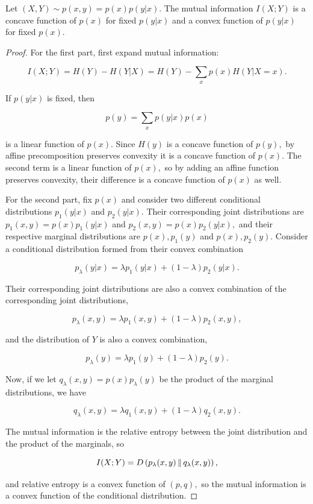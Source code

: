 \documentclass{article}
\begin{document}
\begin{theorem}
	Let $(X,Y) \sim p(x,y) = p(x)p(y|x).$ The \@{mutual information} $I(X;Y)$ is a \@{concave function} of $p(x)$ for fixed $p(y|x)$ and a \@{convex function} of $p(y|x)$ for fixed $p(x).$
\end{theorem}
\begin{proof}
For the first part, first expand \@{mutual information}:

	\[ I(X; Y) = H(Y) - H(Y|X) = H(Y) - \sum_{x} p(x) H(Y|X = x). \]

	If $p(y|x)$ is fixed, then

	\[ p(y) = \sum_{x} p(y | x) p(x) \]

	is a \@{linear function} of $p(x).$ Since $H(y)$ is a \@{concave function} of $p(y),$ by \@{affine precomposition preserves convexity} it is a concave function of $p(x).$ The second term is a linear function of $p(x),$ so by \@{adding an affine function preserves convexity}, their difference is a concave function of $p(x)$ as well.

	For the second part, fix $p(x)$ and consider two different \@{conditional distributions} $p_1(y|x)$ and $p_2(y|x).$ Their corresponding \@{joint distributions} are $p_1(x,y) = p(x) p_1(y|x)$ and $p_2(x,y) = p(x)p_2(y|x),$ and their respective \@{marginal distributions} are $p(x),p_1(y)$ and $p(x), p_2(y).$ Consider a conditional distribution formed from their \@{convex combination}

	\[ p_\lambda(y|x) = \lambda p_1(y|x) + (1 - \lambda)p_2(y|x). \]

	Their corresponding joint distributions are also a convex combination of the corresponding joint distributions,

	\[ p_\lambda(x,y) = \lambda p_1(x,y) + (1 - \lambda) p_2(x,y), \]

	and the distribution of $Y$ is also a \@{convex combination},

	\[ p_\lambda(y) = \lambda p_1(y) + (1 - \lambda) p_2(y). \]

	Now, if we let $q_\lambda(x,y) = p(x) p_\lambda(y)$ be the product of the marginal distributions, we have

	\[ q_\lambda(x,y) = \lambda q_1(x,y) + (1 - \lambda) q_2(x,y). \]

	The mutual information is the \@{relative entropy} between the joint distribution and the product of the marginals, so

	\[ I(X;Y) = D\left( p_\lambda(x,y) \,\middle\|\, q_\lambda(x,y) \right), \]

	and relative entropy is a \@{convex function} of $(p, q),$ so the mutual information is a convex function of the conditional distribution.
\end{proof}
\end{document}
